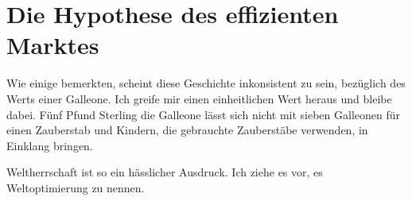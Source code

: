 \chapter{Die Hypothese des effizienten Marktes}

\begin{chapterOpeningAuthorNote}
% 
Wie einige bemerkten, scheint diese Geschichte inkonsistent zu sein, bezüglich des Werts einer Galleone. Ich greife mir einen einheitlichen Wert heraus und bleibe dabei. Fünf Pfund Sterling die Galleone lässt sich nicht mit sieben Galleonen für einen Zauberstab und Kindern, die gebrauchte Zauberstäbe verwenden, in Einklang bringen.
\end{chapterOpeningAuthorNote}
\begin{chapterOpeningQuote}
Weltherrschaft ist so ein hässlicher Ausdruck. Ich ziehe es vor, es Weltoptimierung zu nennen.
\end{chapterOpeningQuote}

